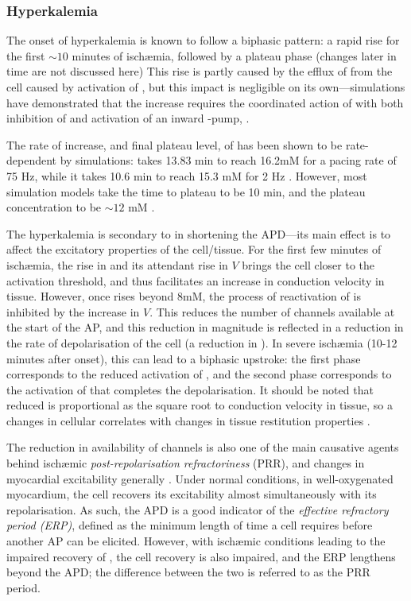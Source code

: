 \documentclass[../thesis-main.tex]{subfiles}
\begin{document}
 \subsubsection{Hyperkalemia}
 \label{subsubsec:hyperkalemia}
 The onset of hyperkalemia is known to follow a biphasic pattern: a rapid rise for the first $\sim10$ minutes of isch\ae mia, followed by a plateau phase (changes later in time are not discussed here) This rise is partly caused by the efflux of \K{} from the cell caused by activation of \ikatp{}, but this impact is negligible on its own---simulations have demonstrated that the increase requires the coordinated action of \ikatp{} with both inhibition of \inak{} and activation of an inward \na{}-pump, \inas{} \citep{Rodriguez2002}.
 
 The rate of increase, and final plateau level, of \ko{} has been shown to be rate-dependent by simulations: \ko{} takes 13.83 min to reach 16.2mM for a pacing rate of 75 Hz, while it takes 10.6 min to reach 15.3 mM for 2 Hz \citep{Rodriguez2002}. However, most simulation models take the time to plateau to be 10 min, and the plateau concentration to be $\sim12$ mM \citep{Ferrero2003a, Trenor2007}.
 
 The hyperkalemia is secondary to \ikatp{} in shortening the APD---its main effect is to affect the excitatory properties of the cell/tissue. For the first few minutes of isch\ae mia, the rise in \ko{} and its attendant rise in $V$ brings the cell closer to the activation threshold, and thus facilitates an increase in conduction velocity in tissue. However, once \ko{} rises beyond 8mM, the process of reactivation of \ina{} is inhibited by the increase in $V$. This reduces the number of \ina{} channels available at the start of the AP, and this reduction in \ina{} magnitude is reflected in a reduction in the rate of depolarisation of the cell (a reduction in \dvdt{}). In severe isch\ae mia (10-12 minutes after onset), this can lead to a biphasic upstroke: the first phase corresponds to the reduced activation of \ina{}, and the second phase corresponds to the activation of \ica{} that completes the depolarisation. It should be noted that reduced \dvdt{} is proportional as the square root to conduction velocity in tissue, so a changes in cellular \dvdt{} correlates with changes in tissue restitution properties \citep{Kleber2004, Walton1983, Tasaki1957}.
 
 The reduction in availability of \ina{} channels is also one of the main causative agents behind isch\ae mic \emph{post-repolarisation refractoriness} (PRR), and changes in myocardial excitability generally \citep{Coronel2012}. Under normal conditions, in well-oxygenated myocardium, the cell recovers its excitability almost simultaneously with its repolarisation. As such, the APD is a good indicator of the \emph{effective refractory period (ERP)}, defined as the minimum length of time a cell requires before another AP can be elicited. However, with isch\ae mic conditions leading to the impaired recovery of \ina{}, the cell recovery is also impaired, and the ERP lengthens beyond the APD; the difference between the two is referred to as the PRR period.
 
\end{document}
